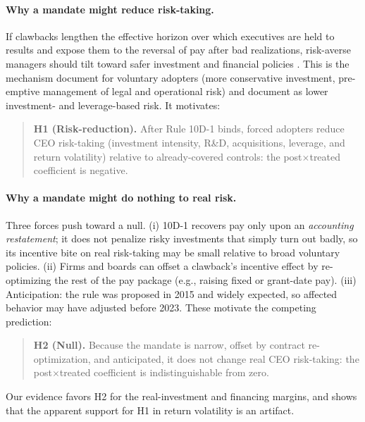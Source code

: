 \documentclass[12pt]{article}
\begin{document}
\paragraph{Why a mandate might reduce risk-taking.} If clawbacks lengthen the effective horizon
over which executives are held to results and expose them to the reversal of pay after bad
realizations, risk-averse managers should tilt toward safer investment and financial policies
\citep{coles2006,bertrand2003}. This is the mechanism \citet{babenko2023} document for voluntary
adopters (more conservative investment, pre-emptive management of legal and operational risk) and
\citet{liu2020} document as lower investment- and leverage-based risk. It motivates:
\begin{quote}
\textbf{H1 (Risk-reduction).} After Rule 10D-1 binds, forced adopters reduce CEO risk-taking
(investment intensity, R\&D, acquisitions, leverage, and return volatility) relative to
already-covered controls: the post$\times$treated coefficient is negative.
\end{quote}

\paragraph{Why a mandate might do nothing to real risk.} Three forces push toward a null. (i)
10D-1 recovers pay only upon an \emph{accounting restatement}; it does not penalize risky
investments that simply turn out badly, so its incentive bite on real risk-taking may be small
relative to broad voluntary policies. (ii) Firms and boards can offset a clawback's incentive
effect by re-optimizing the rest of the pay package (e.g., raising fixed or grant-date pay).
(iii) Anticipation: the rule was proposed in 2015 and widely expected, so affected behavior may
have adjusted before 2023. These motivate the competing prediction:
\begin{quote}
\textbf{H2 (Null).} Because the mandate is narrow, offset by contract re-optimization, and
anticipated, it does not change real CEO risk-taking: the post$\times$treated coefficient is
indistinguishable from zero.
\end{quote}
Our evidence favors H2 for the real-investment and financing margins, and shows that the
apparent support for H1 in return volatility is an artifact.
\end{document}
